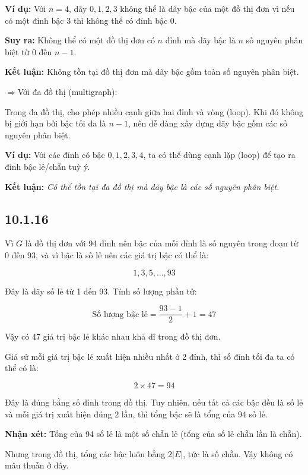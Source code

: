\documentclass{article}
\begin{document}
	\textbf{Ví dụ:} Với \( n = 4 \), dãy \( 0, 1, 2, 3 \) không thể là dãy bậc của một đồ thị đơn vì nếu có một đỉnh bậc 3 thì không thể có đỉnh bậc 0.
	
	\textbf{Suy ra:} Không thể có một đồ thị đơn có \( n \) đỉnh mà dãy bậc là \( n \) số nguyên phân biệt từ \( 0 \) đến \( n-1 \).
	
	\bigskip
	
	\textbf{Kết luận:} Không tồn tại đồ thị đơn mà dãy bậc gồm toàn số nguyên phân biệt.
	
	$\Rightarrow${Với đa đồ thị (multigraph):}
	
	Trong đa đồ thị, cho phép nhiều cạnh giữa hai đỉnh và vòng (loop). Khi đó không bị giới hạn bởi bậc tối đa là \( n-1 \), nên dễ dàng xây dựng dãy bậc gồm các số nguyên phân biệt.
	
	\textbf{Ví dụ:} Với các đỉnh có bậc \( 0, 1, 2, 3, 4 \), ta có thể dùng cạnh lặp (loop) để tạo ra đỉnh bậc lẻ/chẵn tuỳ ý.
	
	\textbf{Kết luận:} \textit{Có thể tồn tại đa đồ thị mà dãy bậc là các số nguyên phân biệt.}
	
	\subsection*{10.1.16}
	Vì \( G \) là đồ thị đơn với 94 đỉnh nên bậc của mỗi đỉnh là số nguyên trong đoạn từ \( 0 \) đến \( 93 \), và vì bậc là số lẻ nên các giá trị bậc có thể là:
	
	\[
	1, 3, 5, \ldots, 93
	\]
	
	Đây là dãy số lẻ từ 1 đến 93. Tính số lượng phần tử:
	
	\[
	\text{Số lượng bậc lẻ} = \frac{93 - 1}{2} + 1 = 47
	\]
	
	Vậy có 47 giá trị bậc lẻ khác nhau khả dĩ trong đồ thị đơn.
	
	\bigskip
	
	Giả sử mỗi giá trị bậc lẻ xuất hiện nhiều nhất ở 2 đỉnh, thì số đỉnh tối đa ta có thể có là:
	
	\[
	2 \times 47 = 94
	\]
	
	Đây là đúng bằng số đỉnh trong đồ thị. Tuy nhiên, nếu tất cả các bậc đều là số lẻ và mỗi giá trị xuất hiện đúng 2 lần, thì tổng bậc sẽ là tổng của 94 số lẻ.
	
	\bigskip
	
	\textbf{Nhận xét:} Tổng của 94 số lẻ là một số chẵn lẻ (tổng của số lẻ chẵn lần là chẵn).
	
	Nhưng trong đồ thị, tổng các bậc luôn bằng \( 2|E| \), tức là số chẵn. Vậy không có mâu thuẫn ở đây.
	
\end{document}

